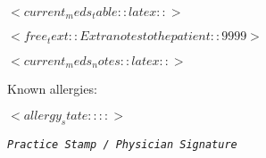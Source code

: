 \documentclass[
	version=last,
	paper=portrait,
	paper=a4,
	DIV=9,									%
	BCOR=0mm,								%
	fontsize=12pt,							%
	parskip=half+,							%
	headsepline=off,
	footsepline=on,
	titlepage=false
]{scrartcl}
\begin{document}

$<current_meds_table::latex::>$


$<free_text::Extra notes to the patient::9999>$

\clearpage
$<current_meds_notes::latex::>$

Known allergies:

$<allergy_state::::>$


\medskip{}
\medskip{}
\medskip{}
\medskip{}

\begin{flushright}
\texttt{\textsl{\footnotesize Practice Stamp / Physician Signature}}
\par\end{flushright}

\end{document}
